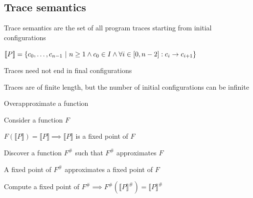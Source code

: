 \subsection{Trace semantics}
\enumstart
	\item Trace semantics are the set of all program traces starting from initial configurations
	\item $\llbracket P \rrbracket = \{c_0, \mathellipsis, c_{n - 1} \ | \ n \ge 1 \land c_0 \in I \land \forall i \in [0, n - 2]: c_i \rightarrow c_{i + 1}\}$
	\item Traces need not end in final configurations
	\item Traces are of finite length, but the number of initial configurations can be infinite
	\item Overapproximate a function
	\enumstart
		\item Consider a function $F$
		\item $F(\llbracket P \rrbracket) = \llbracket P \rrbracket \implies \llbracket P \rrbracket $ is a fixed point of $F$
		\item Discover a function $F^\#$ such that $F^\#$ approximates $F$
		\item A fixed point of $F^\#$ approximates a fixed point of $F$
		\item Compute a fixed point of $F^\# \implies F^\#(\llbracket P \rrbracket^\#) = \llbracket P \rrbracket^\#$
	\enumend
\enumend
